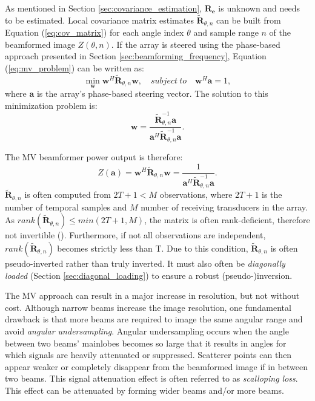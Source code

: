 As mentioned in Section \ref{sec:covariance_estimation}, $\boldsymbol{R_e}$ is unknown and needs to be estimated.
Local covariance matrix estimates $\boldsymbol{\tilde{R}}_{\theta,n}$ can be built from Equation (\ref{eq:cov_matrix}) for each angle index $\theta$ and sample range $n$ of the beamformed image $Z(\theta,n)$.
If the array is steered using the phase-based approach presented in Section \ref{sec:beamforming_frequency}, Equation (\ref{eq:mv_problem}) can be written as:
\begin{equation}
    \min_{\boldsymbol{w}} \boldsymbol{w}^H \boldsymbol{\tilde{R}}_{\theta,n} \boldsymbol{w}, \quad subject ~ to \quad \boldsymbol{w}^H \boldsymbol{a} = 1,
\label{eq:mv_problem_fixed}
\end{equation}
\noindent
where $\boldsymbol{a}$ is the array's phase-based steering vector.
The solution to this minimization problem is:
\begin{equation}
    \boldsymbol{w} = \frac{\boldsymbol{\tilde{R}}_{\theta,n}^{-1} \boldsymbol{a}}{\boldsymbol{a}^H \boldsymbol{\tilde{R}}_{\theta,n}^{-1} \boldsymbol{a}}.
\label{eq:mv_weight}
\end{equation}

\noindent
The MV beamformer power output is therefore:
\begin{equation}
    Z(\boldsymbol{a}) = \boldsymbol{w}^H \boldsymbol{\tilde{R}}_{\theta,n} \boldsymbol{w} =
    \frac{1}{\boldsymbol{a}^H \boldsymbol{\tilde{R}}_{\theta,n}^{-1} \boldsymbol{a}}.
\label{eq:mv_power}
\end{equation}
\noindent
$\boldsymbol{\tilde{R}}_{\theta, n}$ is often computed from $2T+1 < M$ observations, where $2T+1$ is the number of temporal samples and $M$ number of receiving transducers in the array.  As $rank(\boldsymbol{\tilde{R}}_{\theta, n}) \leq min(2T+1, M)$, the matrix is often rank-deficient, therefore not invertible (\cite{Vignon_Focused}). Furthermore, if not all observations are independent, $rank(\boldsymbol{\tilde{R}}_{\theta, n})$ becomes strictly less than T. Due to this condition, $\boldsymbol{\tilde{R}}_{\theta, n}$ is often pseudo-inverted rather than truly inverted. It must also often be \textit{diagonally loaded} (Section \ref{sec:diagonal_loading}) to ensure a robust (pseudo-)inversion.

The MV approach can result in a major increase in resolution, but not without cost.
Although narrow beams increase the image resolution, one fundamental drawback is that more beams are required to image the same angular range and avoid \textit{angular undersampling}. Angular undersampling occurs when the angle between two beams' mainlobes becomes so large that it results in angles for which signals are heavily attenuated or suppressed. Scatterer points can then appear weaker or completely disappear from the beamformed image if in between two beams. This signal attenuation effect is often referred to as \textit{scalloping loss}. This effect can be attenuated by forming wider beams and/or more beams.


